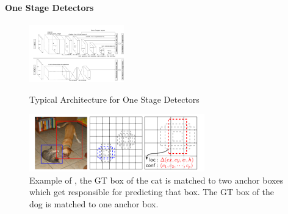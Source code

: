 	\paragraph{One Stage Detectors}
	
	\begin{figure}[h]
		\centering
		\begin{minipage}{0.4\textwidth}
			\centering
			\includegraphics[height=2.5cm]{fig/architecture}
			\caption{Typical Architecture for One Stage Detectors}
			\label{fig:architecture}
		\end{minipage}
		\hspace{2cm}
		\begin{minipage}{0.4\textwidth}
			\centering
			\includegraphics[height=2.5cm]{fig/anchors}
			\caption{Example of \cite{Liu}, the GT box of the cat is matched to two anchor boxes which get responsible for predicting that box. The GT box of the dog is matched to one anchor box.}
			\label{fig:anchors}
		\end{minipage}
	\end{figure}
	
